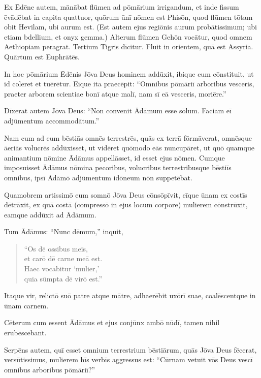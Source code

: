 \Versus Ex Ēdēne autem, mānābat flūmen ad pōmārium irrigandum, et inde fissum ēvādēbat in capita quattuor,
\Versus quōrum ūnī nōmen est Phisōn, quod flūmen tōtam obit Hevilam, ubi aurum est.
\Versus (Est autem ejus regiōnis aurum probātissimum; ubi etiam bdellium, et onyx gemma.)
\Versus Alterum flūmen Gehōn vocātur, quod omnem Aethiopiam peragrat.
\Versus Tertium Tigris dīcitur. Fluit in orientem, quā est Assyria. Quārtum est Euphrātēs.

\Versus In hoc pōmārium Ēdēnis Jōva Deus hominem addūxit, ibique eum cōnstituit, ut id coleret et tuērētur.
\Versus Eīque ita praecēpit: ``Omnibus pōmāriī arboribus vesceris,
\Versus praeter arborem scientiae bonī atque malī, nam sī eā vesceris, moriēre.''

\Versus Dīxerat autem Jōva Deus: ``Nōn convenit Ādāmum esse sōlum. Faciam eī adjūmentum accommodātum.''

\Versus Nam cum ad eum bēstiās omnēs terrestrēs, quās ex terrā fōrmāverat, omnēsque āeriās volucrēs addūxisset, ut vidēret quōmodo eās nuncupāret, ut quō quamque animantium nōmine Ādāmus appellāsset, id esset ejus nōmen.
\Versus Cumque imposuisset Ādāmus nōmina pecoribus, volucribus terrestribusque bēstiīs omnibus, ipsī Ādāmō adjūmentum idōneum nōn suppetēbat.

\Versus Quamobrem artissimō eum somnō Jōva Deus cōnsōpīvit, eīque ūnam ex costīs dētrāxit, ex quā costā (compressō in ejus locum corpore)
\Versus mulierem cōnstrūxit, eamque addūxit ad Ādāmum.

\Versus Tum Ādāmus: ``Nunc dēmum,'' inquit,
\begin{verse}
\begin{patverse*}
 ``Os dē ossibus meīs, \\
 et carō dē carne meā est. \\
 Haec vocābitur `mulier,' \\
 quia sūmpta dē virō est.''
\end{patverse*}
\end{verse}

\Versus Itaque vir, relictō suō patre atque mātre, adhaerēbit uxōrī suae, coalēscentque in ūnam carnem.

\Versus Cēterum cum essent Ādāmus et ejus conjūnx ambō nūdī, tamen nihil ērubēscēbant.



\Caput
\Versus Serpēns autem, quī esset omnium terrestrium bēstiārum, quās Jōva Deus fēcerat, versūtissimus, mulierem hīs verbīs aggressus est: ``Cūrnam vetuit vōs Deus vescī omnibus arboribus pōmāriī?''

